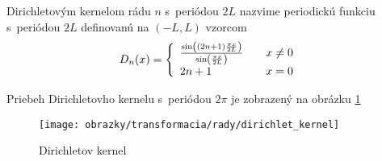 \begin{definicia}
Dirichletovým kernelom  rádu $n$ s~periódou $2L$ nazvime periodickú funkciu
s~periódou $2L$ definovanú na $(-L,L)$ vzorcom
\begin{equation*}
    D_n(x) = \left\{
        \begin{array}{l l}
            \frac{\sin\left((2n+1) \frac{\pi x}{2 L}\right)}{
            \sin\left(\frac{\pi x}{2 L}\right)} \quad& x\not=0 \\
            2n+1 \quad& x=0
        \end{array}
    \right.
\end{equation*}
\end{definicia}

Priebeh Dirichletovho kernelu s~periódou $2\pi$ je zobrazený na
obrázku
\ref{fig:dirichlet_kernel}

\begin{figure}[htp]
    \centering
    \texttt{[image: obrazky/transformacia/rady/dirichlet\_kernel]}
    \caption{Dirichletov kernel}
    \label{fig:dirichlet_kernel}
\end{figure}


